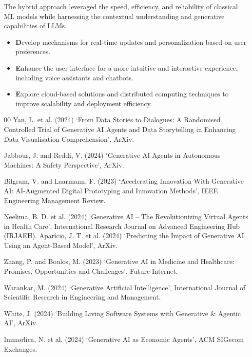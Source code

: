 \documentclass[conference]{IEEEtran}
\begin{document}
\par

The hybrid approach leveraged the speed, efficiency, and reliability of classical ML models while harnessing the contextual understanding and generative capabilities of LLMs. 
\begin{itemize}
    \item \textbf Develop mechanisms for real-time updates and personalization based on user preferences.
    \item \textbf Enhance the user interface for a more intuitive and interactive experience, including voice assistants and chatbots.
    \item \textbf Explore cloud-based solutions and distributed computing techniques to improve scalability and deployment efficiency.
\end{itemize}





\begin{thebibliography}{00}
Yan, L. et al. (2024) ‘From Data Stories to Dialogues: A Randomised Controlled Trial of Generative AI Agents and Data Storytelling in Enhancing Data Visualisation Comprehension’, ArXiv.

 Jabbour, J. and Reddi, V. (2024) ‘Generative AI Agents in Autonomous Machines: A Safety Perspective’, ArXiv.

 Bilgram, V. and Laarmann, F. (2023) ‘Accelerating Innovation With Generative AI: AI-Augmented Digital Prototyping and Innovation Methods’, IEEE Engineering Management Review.

 Neelima, B. D. et al. (2024) ‘Generative AI – The Revolutionizing Virtual Agents in Health Care’, International Research Journal on Advanced Engineering Hub (IRJAEH).
 Aparício, J. T. et al. (2024) ‘Predicting the Impact of Generative AI Using an Agent-Based Model’, ArXiv.

 Zhang, P. and Boulos, M. (2023) ‘Generative AI in Medicine and Healthcare: Promises, Opportunities and Challenges’, Future Internet.

 Warankar, M. (2024) ‘Generative Artificial Intelligence’, International Journal of Scientific Research in Engineering and Management.

 White, J. (2024) ‘Building Living Software Systems with Generative & Agentic AI’, ArXiv.


 Immorlica, N. et al. (2024) ‘Generative AI as Economic Agents’, ACM SIGecom Exchanges.

\end{thebibliography}
\end{document}
